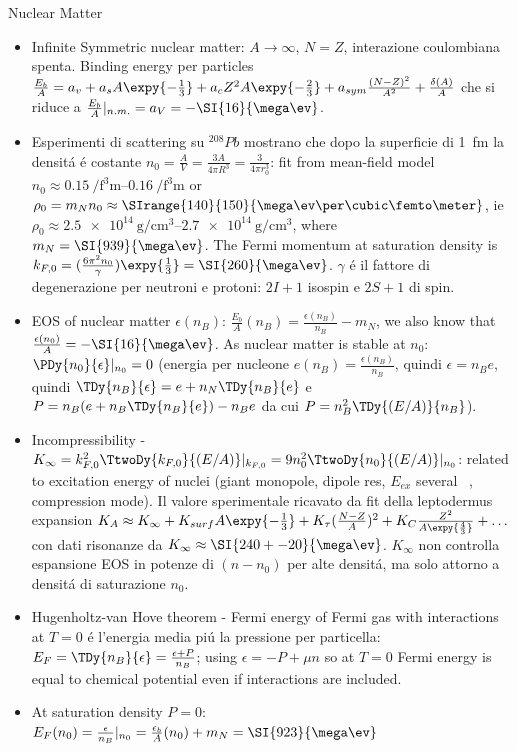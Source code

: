 \begin{frame}{Nuclear Matter}
    \begin{itemize}
        \item Infinite Symmetric nuclear matter: $A\to\infty$, $N=Z$, interazione coulombiana spenta. Binding energy per particles $\frac{E_b}{A}=a_v+a_sA\expy{-\frac{1}{3}}+a_cZ^2A\expy{-\frac{2}{3}}+a_{sym}\frac{(N-Z)^2}{A^2}+\frac{\delta(A)}{A}$ che si riduce a $\frac{E_b}{A}|_{n.m.}=a_V=-\SI{16}{\mega\ev}$.
        \item Esperimenti di scattering su $^{208}Pb$ mostrano che dopo la superficie di \SI{1}{\femto\meter} la densit\'a \'e costante $n_0=\frac{A}{V}=\frac{3A}{4\pi R^3}=\frac{3}{4\pi r_0^3}$: fit from mean-field model $n_0\approx\SIrange{0.15}{0.16}{\per\cubic\femto\meter}$ or $\rho_0=m_Nn_0\approx\SIrange{140}{150}{\mega\ev\per\cubic\femto\meter}$, ie $\rho_0\approx\SIrange{2.5e14}{2.7e14}{\gram\per\cubic\cm}$, where $m_N=\SI{939}{\mega\ev}$. The Fermi momentum at saturation density is $k_{F,0}=(\frac{6\pi^2n_0}{\gamma})\expy{\frac{1}{3}}=\SI{260}{\mega\ev}$. $\gamma$ \'e il fattore di degenerazione per neutroni e protoni: $2I+1$ isospin e $2S+1$ di spin.
        \item EOS of nuclear matter $\epsilon(n_B)$: $\frac{E_b}{A}(n_B)=\frac{\epsilon(n_B)}{n_B}-m_N$, we also know that $\frac{\epsilon(n_0)}{A}=-\SI{16}{\mega\ev}$. As nuclear matter is stable at $n_0$: $\PDy{n_0}{\epsilon}|_{n_0}=0$ (energia per nucleone $e(n_B)=\frac{\epsilon(n_B)}{n_B}$, quindi $\epsilon=n_Be$, quindi $\TDy{n_B}{\epsilon}=e+n_N\TDy{n_B}{e}$ e $P=n_B(e+n_B\TDy{n_B}{e})-n_Be$ da cui $P=n_B^2\TDy{(E/A)}{n_B}$).
        \item Incompressibility - $K_{\infty}=k_{F,0}^2\TtwoDy{k_{F,0}}{(E/A)}|_{k_{F,0}}=9n_0^2\TtwoDy{n_0}{(E/A)}|_{n_0}$: related to excitation energy of nuclei (giant monopole, dipole res, $E_{ex}$ several \si{\mega\ev}, compression mode). Il valore sperimentale ricavato da fit della leptodermus expansion $K_A\approx K_{\infty}+K_{surf}A\expy{-\frac{1}{3}}+K_{\tau}(\frac{N-Z}{A})^2+K_C \frac{Z^2}{A\expy{\frac{4}{3}}}+\ldots$ con dati risonanze da $K_{\infty}\approx\SI{240+-20}{\mega\ev}$. $K_{\infty}$ non controlla espansione EOS in potenze di $(n-n_0)$ per alte densit\'a, ma solo attorno a densit\'a di saturazione $n_0$.
        \item Hugenholtz-van Hove theorem - Fermi energy of Fermi gas with interactions at $T=0$ \'e l'energia media pi\'u la pressione per particella: $E_F=\TDy{n_B}{\epsilon}=\frac{\epsilon+P}{n_B}$; using $\epsilon=-P+\mu n$ so at $T=0$ Fermi energy is equal to chemical potential even if interactions are included.
        \item At saturation density $P=0$: $E_F(n_0)=\frac{\epsilon}{n_B}|_{n_0}=\frac{\epsilon_b}{A}(n_0)+m_N=\SI{923}{\mega\ev}$
    \end{itemize}
\end{frame}

